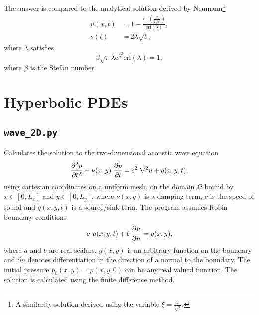 \documentclass{article}
\begin{document}
The answer is compared to the analytical solution derived by Neumann\footnote{A similarity solution derived using the variable $\xi=\frac{x}{\sqrt{t}}$.}
\begin{align*}
u(x,t)&=1-\frac{\mathrm{erf} \left( \frac{x}{2\sqrt{t}} \right) }{ \mathrm{erf} \left( \lambda \right)}, \\
s(t)&=2 \lambda \sqrt{t},
\end{align*}
where $\lambda$ satisfies
\begin{equation}
\beta \sqrt{\pi}\lambda \mathrm{e}^{\lambda^2} \mathrm{erf} \left( \lambda \right) = 1,
\end{equation}
where $\beta$ is the Stefan number.

\section{Hyperbolic PDEs}

\subsection{\texttt{wave\_2D.py}} 
Calculates the solution to the two-dimensional acoustic wave equation
\begin{equation*}
\frac{\partial^2 p}{\partial t^2} + \nu(x,y) \hspace{0.1cm} \frac{\partial p}{\partial t} = c^2 \hspace{0.1cm} \nabla^{2} u + q(x,y,t),
\end{equation*}
using cartesian coordinates on a uniform mesh, on the domain $\Omega$ bound by $x \in [0,L_x]$ and $y \in [0,L_y]$, where $\nu(x,y)$ is a damping term, $c$ is the speed of sound and $q(x,y,t)$ is a source/sink term. The program assumes Robin boundary conditions
\begin{equation*}
a \hspace{0.1cm} u(x,y,t) + b \hspace{0.1cm} \frac{\partial u}{\partial n} = g(x,y),
\end{equation*}
where $a$ and $b$ are real scalars, $g(x,y)$ is an arbitrary function on the boundary and $\partial n$ denotes differentiation in the direction of a normal to the boundary. The initial pressure $p_0(x,y)=p(x,y,0)$ can be any real valued function. The solution is calculated using the finite difference method.
\end{document}
